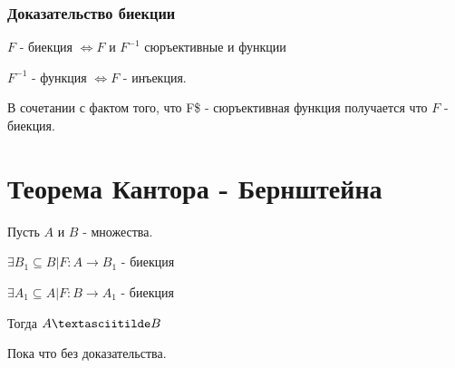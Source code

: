 \documentclass[letterpaper]{article}
\begin{document}
\subsubsection{Доказательство биекции}
\label{sec:org3c4e643}
\(F\) - биекция \(\iff F\) и \(F^{-1}\) сюръективные и функции

\(F^{-1}\) - функция \(\iff F\) - инъекция.

В сочетании с фактом того, что F\$ - сюръективная функция получается что \(F\) - биекция.
\section{Теорема Кантора - Бернштейна}
\label{sec:org21ffcdc}
Пусть \(A\) и \(B\) - множества.

\(\exists B_1 \subseteq B | F: A \rightarrow B_1\) - биекция

\(\exists A_1 \subseteq A | F: B \rightarrow A_1\) - биекция

Тогда \(A \textasciitilde B\)

Пока что без доказательства.
\end{document}
